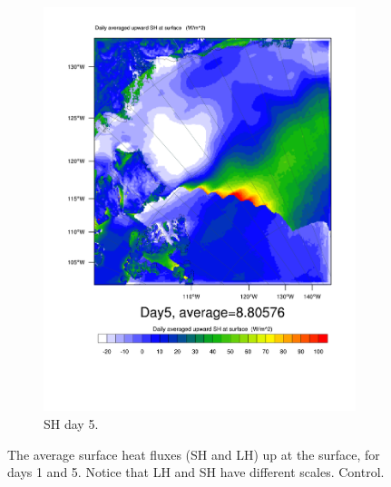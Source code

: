 \begin{figure}
\begin{subfigure}{0.48\textwidth}
		\includegraphics[width=\textwidth]{results/control/HFX_Day5.pdf}
		\caption{SH day 5.}
		\label{subfig:sh_r1Day5}
	\end{subfigure}
	\caption{The average surface heat fluxes (SH and LH) up at the surface, for days 1 and 5. Notice that LH and SH have different scales. Control.}
	\label{fig:surface_fluxes_r1}
\end{figure}

